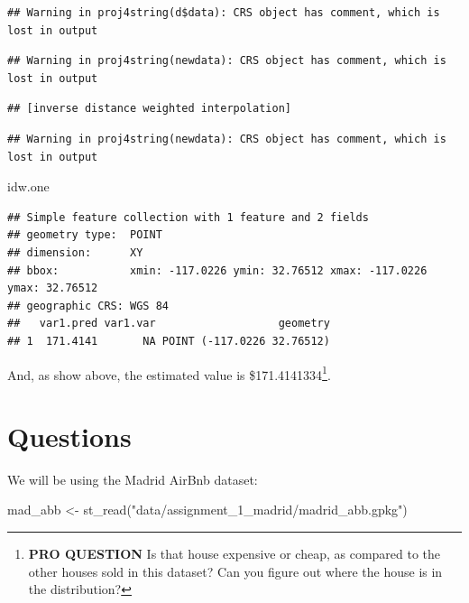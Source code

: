 \documentclass[
]{book}
\newenvironment{Shaded}{\begin{snugshade}}{\end{snugshade}}
\newcommand{\FunctionTok}[1]{\textcolor[rgb]{0.00,0.00,0.00}{#1}}
\newcommand{\NormalTok}[1]{#1}
\newcommand{\OtherTok}[1]{\textcolor[rgb]{0.56,0.35,0.01}{#1}}
\newcommand{\StringTok}[1]{\textcolor[rgb]{0.31,0.60,0.02}{#1}}
\begin{document}
\begin{verbatim}
## Warning in proj4string(d$data): CRS object has comment, which is lost in output
\end{verbatim}

\begin{verbatim}
## Warning in proj4string(newdata): CRS object has comment, which is lost in output
\end{verbatim}

\begin{verbatim}
## [inverse distance weighted interpolation]
\end{verbatim}

\begin{verbatim}
## Warning in proj4string(newdata): CRS object has comment, which is lost in output
\end{verbatim}

\begin{Shaded}
\begin{Highlighting}[]
\NormalTok{idw.one}
\end{Highlighting}
\end{Shaded}

\begin{verbatim}
## Simple feature collection with 1 feature and 2 fields
## geometry type:  POINT
## dimension:      XY
## bbox:           xmin: -117.0226 ymin: 32.76512 xmax: -117.0226 ymax: 32.76512
## geographic CRS: WGS 84
##   var1.pred var1.var                   geometry
## 1  171.4141       NA POINT (-117.0226 32.76512)
\end{verbatim}

And, as show above, the estimated value is \$171.4141334\footnote{\textbf{PRO QUESTION} Is that house expensive or cheap, as compared to the other houses sold in this dataset? Can you figure out where the house is in the distribution?}.

\hypertarget{questions}{%
\section{Questions}\label{questions}}

We will be using the Madrid AirBnb dataset:

\begin{Shaded}
\begin{Highlighting}[]
\NormalTok{mad\_abb }\OtherTok{\textless{}{-}} \FunctionTok{st\_read}\NormalTok{(}\StringTok{"data/assignment\_1\_madrid/madrid\_abb.gpkg"}\NormalTok{)}
\end{Highlighting}
\end{Shaded}
\end{document}
